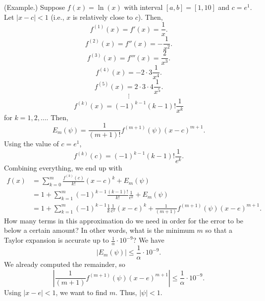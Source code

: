 \documentclass[letterpaper]{article}
\begin{document}
\begin{mdframed}
    (Example.) Suppose $f(x) = \ln(x)$ with interval $[a, b] = [1, 10]$ and $c = e^1.$ Let $|x - c| < 1$ (i.e., $x$ is relatively close to $c$). Then, 
    \[f^{(1)}(x) = f'(x) = \frac{1}{x}.\]
    \[f^{(2)}(x) = f''(x) = -\frac{1}{x^2}.\]
    \[f^{(3)}(x) = f'''(x) = \frac{2}{x^3}.\]
    \[f^{(4)}(x) = -2 \cdot 3 \frac{1}{x^4}.\]
    \[f^{(5)}(x) = 2 \cdot 3 \cdot 4 \frac{1}{x^5}.\]
    \[\vdots\]
    \[f^{(k)}(x) = (-1)^{k - 1} (k - 1)! \frac{1}{x^k}\]
    for $k = 1, 2, \hdots$. Then, 
    \[E_m (\psi) = \frac{1}{(m + 1)!} f^{(m + 1)}(\psi) (x - c)^{m + 1}.\] Using the value of $c = e^1$, \[f^{(k)}(c) = (-1)^{k - 1}(k - 1)! \frac{1}{e^k}.\] Combining everything, we end up with 
    \begin{equation*}
        \begin{aligned}
            f(x) &= \sum_{k = 0}^{m} \frac{f^{(k)} (c)}{k!} (x - c)^k + E_{m}(\psi) \\ 
                &= 1 + \sum_{k = 1}^{m} (-1)^{k - 1} \frac{(k - 1)!}{k!} \frac{1}{e^k} + E_{m}(\psi) \\ 
                &= 1 + \sum_{k = 1}^{m} (-1)^{k - 1} \frac{1}{k} \frac{1}{e^x}(x - e)^k + \frac{1}{(m + 1)} f^{(m + 1)} (\psi) (x - e)^{m + 1}.
        \end{aligned}
    \end{equation*}
    How many terms in this approximation do we need in order for the error to be below a certain amount? In other words, what is the minimum $m$ so that a Taylor expansion is accurate up to $\frac{1}{\alpha} \cdot 10^{-9}$? We have 
    \[|E_m (\psi)| \leq \frac{1}{\alpha} \cdot 10^{-9}.\]
    We already computed the remainder, so 
    \[\left| \frac{1}{(m + 1)} f^{(m + 1)} (\psi) (x - e)^{m + 1}\right| \leq \frac{1}{\alpha} \cdot 10^{-9}.\] Using $|x - e| < 1$, we want to find $m$. Thus, $|\psi| < 1$. 
\end{mdframed}
\end{document}
